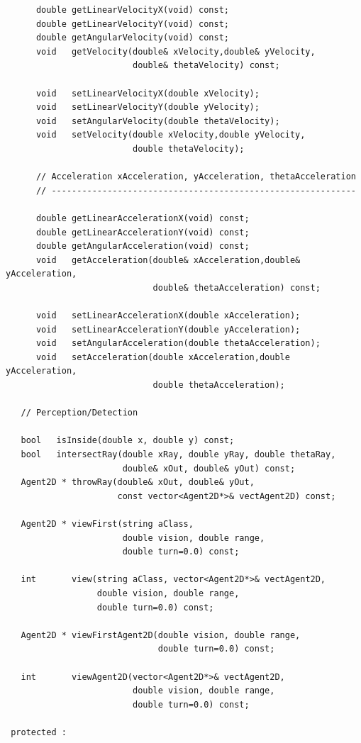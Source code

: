 \documentclass[12pt]{article}
\begin{document}
\begin{small}
\begin{verbatim}
      double getLinearVelocityX(void) const;
      double getLinearVelocityY(void) const;
      double getAngularVelocity(void) const;
      void   getVelocity(double& xVelocity,double& yVelocity,
                         double& thetaVelocity) const;

      void   setLinearVelocityX(double xVelocity);
      void   setLinearVelocityY(double yVelocity);
      void   setAngularVelocity(double thetaVelocity);
      void   setVelocity(double xVelocity,double yVelocity,
                         double thetaVelocity);

      // Acceleration xAcceleration, yAcceleration, thetaAcceleration
      // ------------------------------------------------------------

      double getLinearAccelerationX(void) const;
      double getLinearAccelerationY(void) const;
      double getAngularAcceleration(void) const;
      void   getAcceleration(double& xAcceleration,double& yAcceleration,
                             double& thetaAcceleration) const;

      void   setLinearAccelerationX(double xAcceleration);
      void   setLinearAccelerationY(double yAcceleration);
      void   setAngularAcceleration(double thetaAcceleration);
      void   setAcceleration(double xAcceleration,double yAcceleration,
                             double thetaAcceleration);

   // Perception/Detection

   bool   isInside(double x, double y) const;
   bool   intersectRay(double xRay, double yRay, double thetaRay,
                       double& xOut, double& yOut) const;
   Agent2D * throwRay(double& xOut, double& yOut,
                      const vector<Agent2D*>& vectAgent2D) const;

   Agent2D * viewFirst(string aClass,
                       double vision, double range,
                       double turn=0.0) const;

   int       view(string aClass, vector<Agent2D*>& vectAgent2D,
                  double vision, double range,
                  double turn=0.0) const;

   Agent2D * viewFirstAgent2D(double vision, double range,
                              double turn=0.0) const;

   int       viewAgent2D(vector<Agent2D*>& vectAgent2D,
                         double vision, double range,
                         double turn=0.0) const;

 protected :


\end{verbatim}
\end{small}
\end{document}
